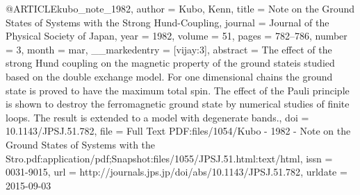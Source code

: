 @ARTICLE{kubo_note_1982,
  author = {Kubo, Kenn},
  title = {Note on the {Ground} {States} of {Systems} with the {Strong} {Hund}-{Coupling}},
  journal = {Journal of the Physical Society of Japan},
  year = {1982},
  volume = {51},
  pages = {782--786},
  number = {3},
  month = mar,
  __markedentry = {[vijay:3]},
  abstract = {The effect of the strong Hund coupling on the magnetic property of
	the ground stateis studied based on the double exchange model. For
	one dimensional chains the ground state is proved to have the maximum
	total spin. The effect of the Pauli principle is shown to destroy
	the ferromagnetic ground state by numerical studies of finite loops.
	The result is extended to a model with degenerate bands.},
  doi = {10.1143/JPSJ.51.782},
  file = {Full Text PDF:files/1054/Kubo - 1982 - Note on the Ground States of Systems with the Stro.pdf:application/pdf;Snapshot:files/1055/JPSJ.51.html:text/html},
  issn = {0031-9015},
  url = {http://journals.jps.jp/doi/abs/10.1143/JPSJ.51.782},
  urldate = {2015-09-03}
}

